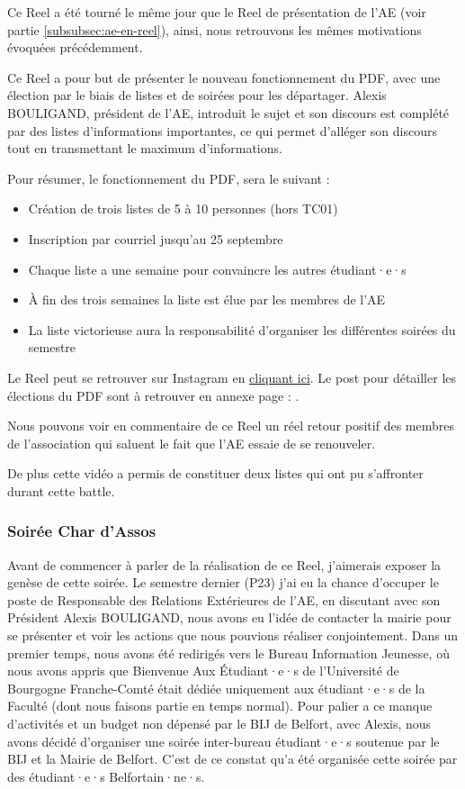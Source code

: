 Ce Reel a été tourné le même jour que le Reel de présentation de l'\gls{AE} (voir partie \ref{subsubsec:ae-en-reel}), ainsi, nous retrouvons les mêmes motivations évoquées précédemment.

Ce Reel a pour but de présenter le nouveau fonctionnement du \gls{PDF}, avec une élection par le biais de listes et de soirées pour les départager.
Alexis BOULIGAND, président de l'\gls{AE}, introduit le sujet et son discours est complété par des listes d'informations importantes, ce qui permet d'alléger son discours tout en transmettant le maximum d'informations.

Pour résumer, le fonctionnement du \gls{PDF}, sera le suivant :
\begin{itemize}
    \item Création de trois listes de 5 à 10 personnes (hors TC01)
    \item Inscription par courriel jusqu'au 25 septembre
    \item Chaque liste a une semaine pour convaincre les autres étudiant·e·s
    \item À fin des trois semaines la liste est élue par les membres de l'\gls{AE}
    \item La liste victorieuse aura la responsabilité d'organiser les différentes soirées du semestre
\end{itemize}

Le Reel peut se retrouver sur Instagram en \href{https://www.instagram.com/reel/CxQtgEXMqon/?utm_source=ig_web_copy_link&igshid=MzRlODBiNWFlZA==}{cliquant ici}.
Le post pour détailler les élections du \gls{PDF} sont à retrouver en annexe page : \pageref{subsec:interface-instagram}.

Nous pouvons voir en commentaire de ce Reel un réel retour positif des membres de l'association qui saluent le fait que l'\gls{AE} essaie de se renouveler.

De plus cette vidéo a permis de constituer deux listes qui ont pu s'affronter durant cette battle.

\subsubsection{Soirée Char d'Assos}

Avant de commencer à parler de la réalisation de ce Reel, j'aimerais exposer la genèse de cette soirée.
Le semestre dernier (P23) j'ai eu la chance d'occuper le poste de Responsable des Relations Extérieures de l'\gls{AE}, en discutant avec son Président Alexis BOULIGAND, nous avons eu l'idée de contacter la mairie pour se présenter et voir les actions que nous pouvions réaliser conjointement.
Dans un premier temps, nous avons été redirigés vers le Bureau Information Jeunesse, où nous avons appris que Bienvenue Aux Étudiant·e·s de l'Université de Bourgogne Franche-Comté était dédiée uniquement aux étudiant·e·s de la Faculté (dont nous faisons partie en temps normal).
Pour palier a ce manque d'activités et un budget non dépensé par le BIJ de Belfort, avec Alexis, nous avons décidé d'organiser une soirée inter-bureau étudiant·e·s soutenue par le BIJ et la Mairie de Belfort.
C'est de ce constat qu'a été organisée cette soirée par des étudiant·e·s Belfortain·ne·s.

